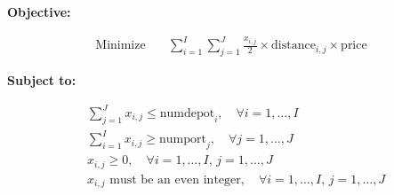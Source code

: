 \documentclass{article}
\begin{document}
\textbf{Objective:}

\begin{align*}
\text{Minimize} \quad & \sum_{i=1}^{I} \sum_{j=1}^{J} \frac{x_{i, j}}{2} \times \text{distance}_{i, j} \times \text{price}
\end{align*}

\textbf{Subject to:}

\begin{align*}
& \sum_{j=1}^{J} x_{i, j} \leq \text{numdepot}_i, \quad \forall i = 1, \ldots, I \\
& \sum_{i=1}^{I} x_{i, j} \geq \text{numport}_j, \quad \forall j = 1, \ldots, J \\
& x_{i, j} \geq 0, \quad \forall i = 1, \ldots, I, \, j = 1, \ldots, J \\
& x_{i, j} \text{ must be an even integer}, \quad \forall i = 1, \ldots, I, \, j = 1, \ldots, J
\end{align*}
\end{document}

